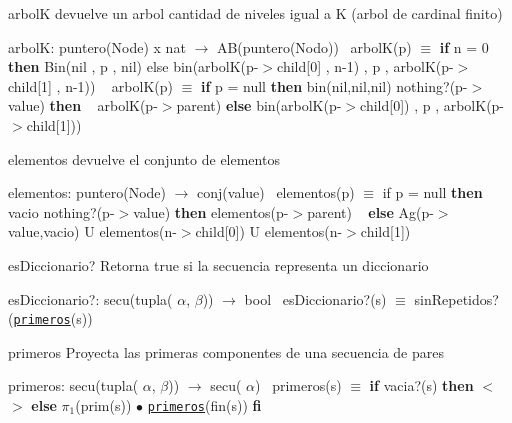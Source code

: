 \begin{DoxyParagraph}{arbolK}
devuelve un arbol cantidad de niveles igual a K (arbol de cardinal finito)

arbolK\+: puntero(\+Node) x nat $\to$ A\+B(puntero(\+Nodo))~\newline
 arbol\+K(p) $\equiv$ {\bfseries if} n = 0 {\bfseries then} Bin(nil , p , nil) else bin(arbolK(p-\/$>$child\mbox{[}0\mbox{]} , n-\/1) , p , arbolK(p-\/$>$child\mbox{[}1\mbox{]} , n-\/1)) ~\newline
 arbol\+K(p) $\equiv$ {\bfseries if} p = null {\bfseries then} bin(nil,nil,nil)  nothing?(p-\/$>$value) {\bfseries then} ~\newline
 arbolK(p-\/$>$parent) {\bfseries else} bin(arbolK(p-\/$>$child\mbox{[}0\mbox{]}) , p , arbolK(p-\/$>$child\mbox{[}1\mbox{]})) 
\end{DoxyParagraph}


\begin{DoxyParagraph}{elementos}
devuelve el conjunto de elementos

elementos\+: puntero(\+Node) $\to$ conj(value)~\newline
 elementos(p) $\equiv$ if p = null {\bfseries then} vacio  nothing?(p-\/$>$value) {\bfseries then} elementos(p-\/$>$parent) ~\newline
 {\bfseries else} Ag(p-\/$>$value,vacio) U elementos(n-\/$>$child\mbox{[}0\mbox{]}) U elementos(n-\/$>$child\mbox{[}1\mbox{]}) 
\end{DoxyParagraph}


\begin{DoxyParagraph}{es\+Diccionario?}
Retorna true si la secuencia representa un diccionario

es\+Diccionario?\+: secu(tupla( $\alpha$, $\beta$)) $\to$ bool~\newline
 es\+Diccionario?(s) $\equiv$ sin\+Repetidos?(\href{axiomas.html#primeros}{\tt primeros}(s)) 
\end{DoxyParagraph}


\begin{DoxyParagraph}{primeros}
Proyecta las primeras componentes de una secuencia de pares

primeros\+: secu(tupla( $\alpha$, $\beta$)) $\to$ secu( $\alpha$)~\newline
 primeros(s) $\equiv$ {\bfseries if} vacia?(s) {\bfseries then} $<$$>$ {\bfseries else} $\pi_1$(prim(s)) $\bullet$ \href{axiomas.html#primeros}{\tt primeros}(fin(s)) {\bfseries fi} 
\end{DoxyParagraph}
